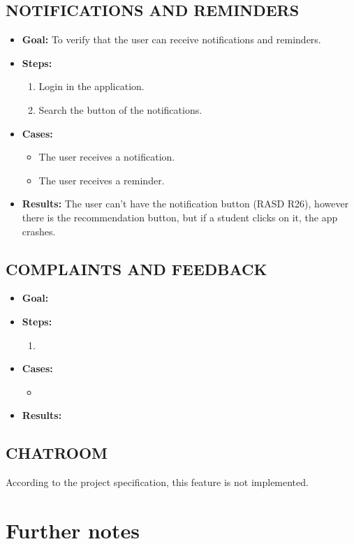 \subsection{NOTIFICATIONS AND REMINDERS}\label{subsec:notifications-and-reminders}
\begin{itemize}
    \item \textbf{Goal:} To verify that the user can receive notifications and reminders.

    \item \textbf{Steps:}
    \begin{enumerate}
        \item Login in the application.
        \item Search the button of the notifications.
    \end{enumerate}
    \item \textbf{Cases:}
    \begin{itemize}
        \item The user receives a notification.
        \item The user receives a reminder.
    \end{itemize}
    \item \textbf{Results:}
    The user can't have the notification button (RASD R26),
    however there is the recommendation button, but if a student clicks on it, the app crashes.

\end{itemize}

\subsection{COMPLAINTS AND FEEDBACK}\label{subsec:complaints-and-feedback}
\begin{itemize}
    \item \textbf{Goal:}

    \item \textbf{Steps:}
    \begin{enumerate}
        \item

    \end{enumerate}
    \item \textbf{Cases:}
    \begin{itemize}
        \item
    \end{itemize}
    \item \textbf{Results:}

\end{itemize}

\subsection{CHATROOM}\label{subsec:chatroom}
According to the project specification, this feature is not implemented.


\section{Further notes}\label{sec:further-notes}

